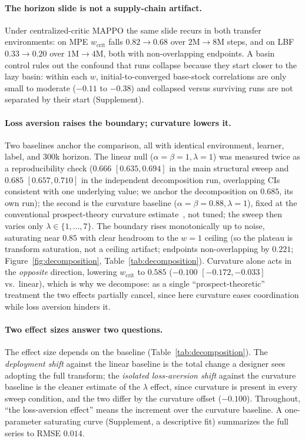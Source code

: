\documentclass[letterpaper]{article} %
\theoremstyle{plain}
\newcommand{\wcrit}{w_{\mathrm{crit}}}
\begin{document}
\paragraph{The horizon slide is not a supply-chain artifact.}
Under centralized-critic MAPPO the same slide recurs in both transfer environments: on MPE $\wcrit$
falls $0.82\to0.68$ over $2\mathrm{M}\to8\mathrm{M}$ steps, and on LBF $0.33\to0.20$ over
$1\mathrm{M}\to4\mathrm{M}$, both with non-overlapping endpoints. A basin control rules out the
confound that runs collapse because they start closer to the lazy basin: within each $w$,
initial-to-converged base-stock correlations are only small to moderate ($-0.11$ to $-0.38$) and
collapsed versus surviving runs are not separated by their start (Supplement).

\paragraph{Loss aversion raises the boundary; curvature lowers it.}
Two baselines anchor the comparison, all with identical environment, learner, label, and 300k
horizon. The linear null ($\alpha{=}\beta{=}1,\lambda{=}1$) was measured twice as a reproducibility
check ($0.666$ $[0.635,0.694]$ in the main structural sweep and $0.685$ $[0.657,0.710]$ in the
independent decomposition run, overlapping CIs consistent with one underlying value; we anchor the
decomposition on $0.685$, its own run); the second is the curvature baseline
($\alpha{=}\beta{=}0.88,\lambda{=}1$), fixed at the conventional prospect-theory curvature
estimate~\citep{tversky1992}, not tuned; the sweep then varies only $\lambda\in\{1,\dots,7\}$. The
boundary rises monotonically up to noise, saturating near $0.85$ with clear headroom to the $w{=}1$
ceiling (so the plateau is transform saturation, not a ceiling artifact; endpoints non-overlapping by
$0.221$; Figure~\ref{fig:decomposition}, Table~\ref{tab:decomposition}). Curvature alone acts in the
\emph{opposite} direction, lowering $\wcrit$ to $0.585$ ($-0.100$ $[-0.172,-0.033]$ vs.\ linear), which
is why we decompose: as a single ``prospect-theoretic'' treatment the two effects partially cancel,
since here curvature eases coordination while loss aversion hinders it.

\paragraph{Two effect sizes answer two questions.}
The effect size depends on the baseline (Table~\ref{tab:decomposition}). The \emph{deployment shift}
against the linear baseline is the total change a designer sees adopting the full transform; the
\emph{isolated loss-aversion shift} against the curvature baseline is the cleaner estimate of the
$\lambda$ effect,
since curvature is present in every sweep condition, and the two differ by the curvature offset
($-0.100$). Throughout, ``the loss-aversion effect'' means the increment over the curvature baseline.
A one-parameter saturating curve (Supplement, a descriptive fit) summarizes the full series to RMSE
$0.014$.
\end{document}
